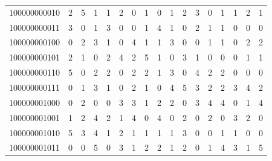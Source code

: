\documentclass[10pt,a4paper]{article}
\begin{document}
\begin{longtable}{ |c|c|c|c|c|c|c|c|c|c|c|c|c|c|c|c|c| }
    100000000010              & 2                            & 5                                & 1                            & 1                              & 2   & 0   & 1   & 0   & 1   & 2   & 3   & 0   & 1   & 1   & 2   & 1   \\
    100000000011              & 3                            & 0                                & 1                            & 3                              & 0   & 0   & 1   & 4   & 1   & 0   & 2   & 1   & 1   & 0   & 0   & 0   \\
    100000000100              & 0                            & 2                                & 3                            & 1                              & 0   & 4   & 1   & 1   & 3   & 0   & 0   & 1   & 1   & 0   & 2   & 2   \\
    100000000101              & 2                            & 1                                & 0                            & 2                              & 4   & 2   & 5   & 1   & 0   & 3   & 1   & 0   & 0   & 0   & 1   & 1   \\
    100000000110              & 5                            & 0                                & 2                            & 2                              & 0   & 2   & 2   & 1   & 3   & 0   & 4   & 2   & 2   & 0   & 0   & 0   \\
    100000000111              & 0                            & 1                                & 3                            & 1                              & 0   & 2   & 1   & 0   & 4   & 5   & 3   & 2   & 2   & 3   & 4   & 2   \\
    100000001000              & 0                            & 2                                & 0                            & 0                              & 3   & 3   & 1   & 2   & 2   & 0   & 3   & 4   & 4   & 0   & 1   & 4   \\
    100000001001              & 1                            & 2                                & 4                            & 2                              & 1   & 4   & 0   & 4   & 0   & 2   & 0   & 2   & 0   & 3   & 2   & 0   \\
    100000001010              & 5                            & 3                                & 4                            & 1                              & 2   & 1   & 1   & 1   & 1   & 3   & 0   & 0   & 1   & 1   & 0   & 0   \\
    100000001011              & 0                            & 0                                & 5                            & 0                              & 3   & 1   & 2   & 2   & 1   & 2   & 0   & 1   & 4   & 3   & 1   & 5   \\

\end{longtable}
\end{document}
